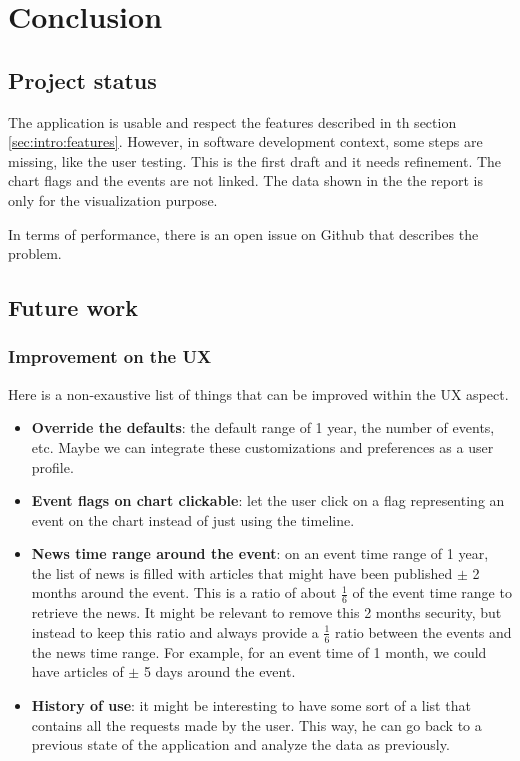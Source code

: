 \chapter{Conclusion}
\label{chapter:conclusions}

\section{Project status}
The application is usable and respect the features described in th section \ref{sec:intro:features}. However, in software development context, some steps are missing, like the user testing. This is the first draft and it needs refinement. The chart flags and the events are not linked. The data shown in the the report is only for the visualization purpose.

In terms of performance, there is an open issue on Github that describes the problem.

\section{Future work}

\subsection{Improvement on the UX}
Here is a non-exaustive list of things that can be improved within the UX aspect.
\begin{itemize}
    \item \textbf{Override the defaults}: the default range of 1 year, the number of events, etc. Maybe we can integrate these customizations and preferences as a user profile.
    \item \textbf{Event flags on chart clickable}: let the user click on a flag representing an event on the chart instead of just using the timeline.
    \item \textbf{News time range around the event}: on an event time range of 1 year, the list of news is filled with articles that might have been published $\pm$ 2 months around the event. This is a ratio of about $\frac{1}{6}$ of the event time range to retrieve the news. It might be relevant to remove this 2 months security, but instead to keep this ratio and always provide a $\frac{1}{6}$ ratio between the events and the news time range. For example, for an event time of 1 month, we could have articles of $\pm$ 5 days around the event.
    \item \textbf{History of use}: it might be interesting to have some sort of a list that contains all the requests made by the user. This way, he can go back to a previous state of the application and analyze the data as previously.
\end{itemize}

